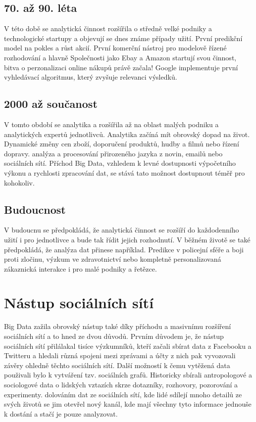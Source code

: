 \subsection{70. až 90. léta}
V této době se analytická činnost rozšířila o středně velké podniky a technologické startupy a objevují se dnes známe případy užití. První predikční model na pokles a růst akcií. První komerční nástroj pro modelově řízené rozhodování a hlavně Společnosti jako Ebay a Amazon startují svou činnost, bitva o perzonalizaci online nákupů právě začala! Google implementuje první vyhledávací algoritmus, který zvyšuje relevanci výsledků.

\subsection{2000 až součanost}
V tomto období se analytika a rozšířila až na oblast malých podniku a analytických expertů jednotlivců. Analytika začíná mít obrovský dopad na život. Dynamické změny cen zboží, doporučení produktů, hudby a filmů nebo řízení dopravy. analýza a procesování přirozeného jazyka z novin, emailů nebo sociálních sítí. Příchod Big Data, vzhledem k levné dostupnosti výpočetního výkonu a rychlosti zpracování dat, se stává tato možnost dostupnout téměř pro kohokoliv.

\subsection{Budoucnost}
V budoucnu se předpokládá, že analytická činnost se rozšíří do každodenního užití i pro jednotlivce a bude tak řídit jejich rozhodnutí. V běžném životě se také předpokládá, že analýza dat přinese například. Predikce v policejní sféře a boji proti zločinu, výzkum ve zdravotnictví nebo kompletně personalizovaná zákaznická interakce i pro malé podniky a řetězce.

\section{Nástup sociálních sítí}
Big Data zažila obrovský nástup také díky příchodu a masivnímu rozšíření sociálních sítí a to hned ze dvou důvodů. Prvním důvodem je, že nástup sociálních sítí přilálakal tisíce výzkumníků, kteří začali sbírat data z Facebooku a Twitteru a hledali různá spojeni mezi zprávami a účty z nich pak vyvozovali závěry ohledně těchto sociálních sítí. Další možností k čemu vytěžená data použivali bylo k vytváření tzv. sociálních grafů. Historicky sbírali antropologové a sociologové data o lidských vztazích skrze dotazníky, rozhovory, pozorování a experimenty. dolováním dat ze sociálních sítí, kde lidé sdílejí mnoho detailů ze svých životů se jim otevřel nový kanál, kde mají všechny tyto informace jednouše k dostání a stačí je pouze analyzovat.

